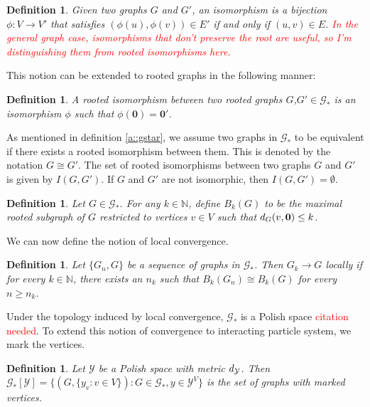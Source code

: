 \documentclass[12pt]{article}
\newcommand{\mb}{\mathbb}
\newcommand{\mc}{\mathcal}
\newcommand{\ra}{\rightarrow}
\newcommand{\tr}{\textcolor{red}}
\renewcommand{\root}{\mathbf{0}}					%
\newcommand{\xg}{y}									%
\newcommand{\met}[2]{
\ifstrempty{#2}{
	d_{#1}}{
	d_{#1,#2}}}										%
\newcommand{\vind}[1]{_{#1}}						%
\newcommand{\Gs}{\mc{G}_\ast}						%
\newcommand{\iso}{I}								%
\newcommand{\trnc}[1]{B_{#1}}						%
\newcommand{\spce}{\mc{Y}}							%
\renewcommand{\sp}[1]{[#1]}							%
\renewcommand{\it}[1]{_{#1}}						%
\newtheorem{defn}[thms]{Definition}
\begin{document}
\begin{defn}
Given two graphs \(G\) and \(G'\), an isomorphism is a bijection \(\phi: V \ra V'\) that satisfies \((\phi(u),\phi(v)) \in E'\) if and only if \((u,v) \in E\). \tr{In the general graph case, isomorphisms that don't preserve the root are useful, so I'm distinguishing them from rooted isomorphisms here.}
\label{lwc::iso}
\end{defn}

This notion can be extended to rooted graphs in the following manner:

\begin{defn}
A rooted isomorphism between two rooted graphs \(G\),\(G' \in \Gs\) is an isomorphism \(\phi\) such that \(\phi(\root) = \root'\).
\label{lwc::riso}
\end{defn}

As mentioned in definition \ref{a::gstar}, we assume two graphs in \(\Gs\) to be equivalent if there exists a rooted isomorphism between them. This is denoted by the notation \(G \cong G'\). The set of rooted isomorphisms between two graphs \(G\) and \(G'\) is given by \(\iso(G,G')\). If \(G\) and \(G'\) are not isomorphic, then \(\iso(G,G') = \emptyset\).

\begin{defn}
Let \(G \in \Gs\). For any \(k \in \mb{N}\), define \(\trnc{k}(G)\) to be the maximal rooted subgraph of \(G\) restricted to vertices \(v \in V\) such that \(\met{G}{}(v,\root) \leq k\).
\label{lwc::trnc}
\end{defn}

We can now define the notion of local convergence.

\begin{defn}
Let \(\{G\it{n},G\}\) be a sequence of graphs in \(\Gs\). Then \(G\it{k} \ra G\) locally if for every \(k \in \mb{N}\), there exists an \(n_k\) such that \(\trnc{k}(G\it{n}) \cong \trnc{k}(G)\) for every \(n \geq n_k\).
\label{lwc::lc}
\end{defn}

Under the topology induced by local convergence, \(\Gs\) is a Polish space \tr{citation needed}. To extend this notion of convergence to interacting particle system, we mark the vertices.

\begin{defn}
Let \(\spce\) be a Polish space with metric \(\met{\spce}{}\). Then \(\Gs\sp{\spce} = \{(G,\{\xg\vind{v}:v \in V\}): G \in \Gs, \xg\in \spce^V\}\) is the set of graphs with marked vertices.
\label{lwc::marked}
\end{defn}
\end{document}

